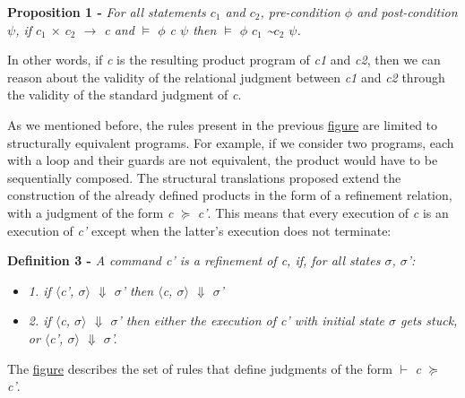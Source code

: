 \textbf{Proposition 1 -}  \emph{For all statements $c_1$ and $c_2$, pre-condition $\phi$ and post-condition $\psi$, if $c_1$ $\times$ $c_2$ $\rightarrow$ c and $\vDash$ {$\phi$} c {$\psi$} then $\vDash$ {$\phi$} $c_1$ \textasciitilde $c_2$ {$\psi$}.}

\bigskip
In other words, if \emph{c} is the resulting product program of \emph{c1} and \emph{c2}, then we can reason about the validity of the relational judgment between \emph{c1} and \emph{c2} through the validity of the standard judgment of \emph{c}.

As we mentioned before, the rules present in the previous \hyperref[fig:product_construction_equal_struct]{figure} are limited to structurally equivalent programs.
For example, if we consider two programs, each with a loop and their guards are not equivalent, the product would have to be sequentially composed.
The structural translations proposed extend the construction of the already defined products in the form of a refinement relation, with a judgment of the form \emph{c} $\succcurlyeq$ \emph{c'}. 
This means that every execution of \emph{c} is an execution of \emph{c'} except when the latter's execution does not terminate:
\bigskip

\textbf{Definition 3 -}  \emph{A command c' is a refinement of c, if, for all states $\sigma$, $\sigma$':}    
\begin{itemize}
  \item{\emph{1. if $\langle$c', $\sigma$$\rangle$ $\Downarrow$ $\sigma$' then $\langle$c, $\sigma$$\rangle$ $\Downarrow$ $\sigma$'}}
  \vspace{-10pt}
  \item{\emph{2. if $\langle$c, $\sigma$$\rangle$ $\Downarrow$ $\sigma$' then either the execution of c' with initial state $\sigma$ gets stuck, or $\langle$c', $\sigma$$\rangle$ $\Downarrow$ $\sigma$'.}}
\end{itemize}

\bigskip
The \hyperref[fig:product_construction_reduction]{figure} describes the set of rules that define judgments of the form $\vdash$ \emph{c} $\succcurlyeq$ \emph{c'}.

